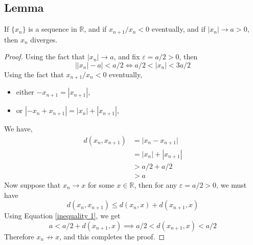 \documentclass[../../main.tex]{subfiles}
\begin{document}
\providecommand{\xn}{\{x_n\}}
\subsection{Lemma}
\begin{lemma}\label{lemma:alternating sequence, that does not vanish eventually diverges}
    If $\xn$ is a sequence in $\mathbb{R}$, and if $x_{n+1}/x_n<0$ eventually, and if $|x_n|\to a>0$, then $x_n$ diverges.
\end{lemma}
\begin{proof}
    Using the fact that $|x_n|\to a$, and fix $\varepsilon=a/2>0$, then 
    \[
        \biggl||x_n|-a\biggr|<a/2 \iff a/2<|x_n|<3a/2
    \]
    Using the fact that $x_{n+1}/x_n<0$ eventually, 
    \begin{itemize}
        \item either $-x_{n+1}=|x_{n+1}|$,
        \item or $|-x_n+x_{n+1}|=|x_n|+|x_{n+1}|$,
    \end{itemize}
    We have,
    \begin{align}
        d(x_n,x_{n+1})&=\biggl|x_n-x_{n+1}\biggr|\nonumber\\
        &=|x_n|+|x_{n+1}|\nonumber\\
        &>a/2+a/2\nonumber\\
        &>a\label{inequality 1}
    \end{align}
    Now suppose that $x_n\to x$ for some $x\in\mathbb{R}$, then for any $\varepsilon=a/2>0$, we must have
    \[
        d(x_n,x_{n+1})\leq d(x_n,x) + d(x_{n+1},x)
    \]
    Using Equation \eqref{inequality 1}, we get
    \[
        a<a/2+d(x_{n+1},x)\implies a/2<d(x_{n+1},x)<a/2
    \]
    Therefore $x_n\not\to x$, and this completes the proof.
\end{proof}
\end{document}

